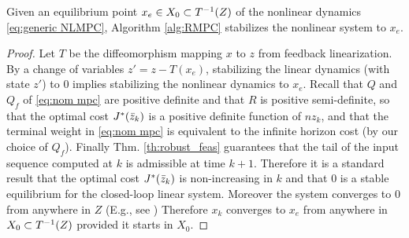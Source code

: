 
\begin{theorem}[Stability]
	\label{thm:stability}
Given an equilibrium point $x_e \in X_0 \subset T^{-1}(Z)$ of the nonlinear dynamics \eqref{eq:generic NLMPC}, Algorithm \ref{alg:RMPC} stabilizes the nonlinear system to $x_e$.
\end{theorem}

\begin{proof}
Let $T$ be the diffeomorphism mapping $x$ to $z$ from feedback linearization.
By a change of variables $z' = z - T(x_e)$, stabilizing the linear dynamics (with state $z'$) to 0 implies stabilizing the nonlinear dynamics to $x_e$.
Recall that $Q$ and $Q_f$ of  \eqref{eq:nom mpc} are positive definite and that $R$ is positive semi-definite,  so that the optimal cost $J^*(\bar{z}_{k})$ is a positive definite function of $nz_{k}$, and that the terminal weight in \eqref{eq:nom mpc} is equivalent to the infinite horizon cost (by our choice of $Q_f$). 
Finally Thm.  \ref{th:robust_feas} guarantees that the tail of the input sequence computed at $k$ is admissible at time $k+1$. 
Therefore it is a standard result that the optimal cost $J^{*}({\bar{z}}_{k})$ is non-increasing in $k$ and that $0$ is a stable equilibrium for the closed-loop linear system. 
Moreover the system converges to 0 from anywhere in $Z$ (E.g., see \cite{CannonK15MPC} )
Therefore $x_k$ converges to $x_e$ from anywhere in $X_0 \subset T^{-1}(Z)$ provided it starts in $X_0$.
\end{proof}